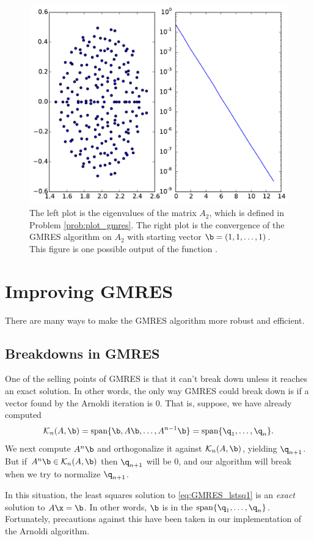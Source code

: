 \begin{figure}[H]
\includegraphics[width=.7\textwidth]{figures/plot_gmres.pdf}
\caption{The left plot is the eigenvalues of the matrix $A_2$, which is defined in Problem \ref{prob:plot_gmres}.
The right plot is the convergence of the GMRES algorithm on $A_2$ with starting vector $\b = (1, 1, \ldots, 1)$.
This figure is one possible output of the function .}
\label{fig:plot_gmres}
\end{figure}

\section*{Improving GMRES} %

There are many ways to make the GMRES algorithm more robust and efficient.

\subsection*{Breakdowns in GMRES} %

One of the selling points of GMRES is that it can't break down unless it reaches an exact solution.
In other words, the only way GMRES could break down is if a vector found by the Arnoldi iteration is 0.
That is, suppose, we have already computed
\[\mathcal{K}_n(A, \b) = \text{span}\{\b, A\b, \ldots, A^{n-1}\b\} = \text{span}\{\q_1, \ldots, \q_n\}.\]
We next compute $A^n\b$ and orthogonalize it against $\mathcal{K}_n(A, \b)$, yielding $\q_{n+1}$.
But if $A^n\b \in \mathcal{K}_n(A,\b)$ then $\q_{n+1}$ will be 0, and our algorithm will break when we try to normalize $\q_{n+1}$.

In this situation, the least squares solution to \eqref{eq:GMRES_lstsq1} is an \emph{exact} solution to $A\x=\b$.
In other words, $\b$ is in the $\text{span}\{\q_1, \ldots, \q_n\}$.  Fortunately, precautions against this have been taken in our implementation of the Arnoldi algorithm.

